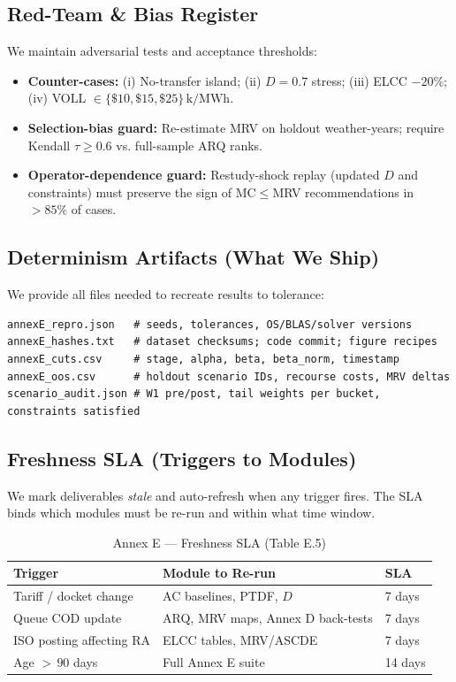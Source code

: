 \documentclass[11pt]{article}
\numberwithin{equation}{section}
\theoremstyle{definition}
\theoremstyle{remark}
\begin{document}
\subsection{ Red-Team \& Bias Register}
\label{E8}
We maintain adversarial tests and acceptance thresholds:

\begin{itemize}[leftmargin=1.2em]
  \item \textbf{Counter-cases:} (i) No-transfer island; (ii) $D=0.7$ stress; (iii) ELCC $-20\%$; (iv) VOLL $\in\{\$10,\$15,\$25\}\,\mathrm{k}/\mathrm{MWh}$.
  \item \textbf{Selection-bias guard:} Re-estimate MRV on holdout weather-years; require Kendall $\tau \ge 0.6$ vs. full-sample ARQ ranks.
  \item \textbf{Operator-dependence guard:} Restudy-shock replay (updated $D$ and constraints) must preserve the sign of MC$\le$MRV recommendations in $>\!85\%$ of cases.
\end{itemize}

\subsection{ Determinism Artifacts (What We Ship)}
\label{E9}
We provide all files needed to recreate results to tolerance:

\begin{lstlisting}[style=annexe]
annexE_repro.json   # seeds, tolerances, OS/BLAS/solver versions
annexE_hashes.txt   # dataset checksums; code commit; figure recipes
annexE_cuts.csv     # stage, alpha, beta, beta_norm, timestamp
annexE_oos.csv      # holdout scenario IDs, recourse costs, MRV deltas
scenario_audit.json # W1 pre/post, tail weights per bucket, constraints satisfied
\end{lstlisting}

\subsection{ Freshness SLA (Triggers to Modules)}
\label{E10}
We mark deliverables \emph{stale} and auto-refresh when any trigger fires. The SLA binds which modules must be re-run and within what time window.

\begin{table}[h]
\centering
\caption{Annex E — Freshness SLA (Table E.5)}
\label{tab:freshness}
\begin{tabular}{@{}lll@{}}
\toprule
\textbf{Trigger} & \textbf{Module to Re-run} & \textbf{SLA} \\
\midrule
Tariff / docket change & AC baselines, PTDF, $D$ & 7 days \\
Queue COD update & ARQ, MRV maps, Annex D back-tests & 7 days \\
ISO posting affecting RA & ELCC tables, MRV/ASCDE & 7 days \\
Age $>\,90$ days & Full Annex E suite & 14 days \\
\bottomrule
\end{tabular}
\end{table}
\end{document}
